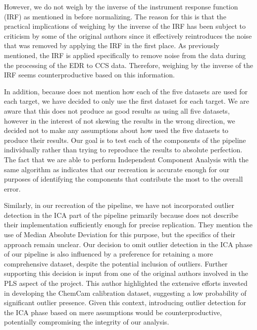 However, we do not weigh by the inverse of the instrument response function (IRF) as mentioned in \citeauthor{cleggRecalibrationMarsScience2017} before normalizing.
The reason for this is that the practical implications of weighing by the inverse of the IRF has been subject to criticism by some of the original authors since it effectively reintroduces the noise that was removed by applying the IRF in the first place.
As previously mentioned, the IRF is applied specifically to remove noise from the data during the processing of the EDR to CCS data.
Therefore, weighing by the inverse of the IRF seems counterproductive based on this information.

In addition, because \citeauthor{cleggRecalibrationMarsScience2017} does not mention how each of the five datasets are used for each target, we have decided to only use the first dataset for each target.
We are aware that this does not produce as good results as using all five datasets, however in the interest of not skewing the results in the wrong direction, we decided not to make any assumptions about how \citeauthor{cleggRecalibrationMarsScience2017} used the five datasets to produce their results.
Our goal is to test each of the components of the pipeline individually rather than trying to reproduce the results to absolute perfection.
The fact that we are able to perform Independent Component Analysis with the same algorithm as \citeauthor{cleggRecalibrationMarsScience2017} indicates that our recreation is accurate enough for our purposes of identifying the components that contribute the most to the overall error.

Similarly, in our recreation of the pipeline, we have not incorporated outlier detection in the ICA part of the pipeline primarily because \citeauthor{cleggRecalibrationMarsScience2017} does not describe their implementation sufficiently enough for precise replication.
They mention the use of Median Absolute Deviation for this purpose, but the specifics of their approach remain unclear.
Our decision to omit outlier detection in the ICA phase of our pipeline is also influenced by a preference for retaining a more comprehensive dataset, despite the potential inclusion of outliers.
Further supporting this decision is input from one of the original authors involved in the PLS aspect of the project.
This author highlighted the extensive efforts invested in developing the ChemCam calibration dataset, suggesting a low probability of significant outlier presence.
Given this context, introducing outlier detection for the ICA phase based on mere assumptions would be counterproductive, potentially compromising the integrity of our analysis.

